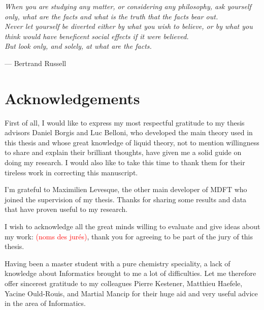 
\begin{flushright}
\textsl{When you are studying any matter, or considering any philosophy,
ask yourself only, what are the facts and what is the truth that the
facts bear out.}\\
\textsl{ Never let yourself be diverted either by what you wish to
believe, or by what you think would have beneficent social effects
if it were believed.}\\
\textsl{ But look only, and solely, at what are the facts.}
\par\end{flushright}

\begin{flushright}
--- Bertrand Russell 
\par\end{flushright}

\bigskip{}


\begingroup
\let\clearpage\relax
\let\cleardoublepage\relax 


\chapter*{Acknowledgements}

First of all, I would like to express my most respectful gratitude
to my thesis advisors Daniel Borgis and Luc Belloni, who developed
the main theory used in this thesis and whose great knowledge of liquid
theory, not to mention willingness to share and explain their brilliant
thoughts, have given me a solid guide on doing my research. I would
also like to take this time to thank them for their tireless work
in correcting this manuscript.

I'm grateful to Maximilien Levesque, the other main developer of MDFT
who joined the supervision of my thesis. Thanks for sharing some results
and data that have proven useful to my research.

I wish to acknowledge all the great minds willing to evaluate and
give ideas about my work: \textcolor{red}{(noms des jurés)}, thank
you for agreeing to be part of the jury of this thesis.

Having been a master student with a pure chemistry speciality, a lack
of knowledge about Informatics brought to me a lot of difficulties.
Let me therefore offer sincerest gratitude to my colleagues Pierre
Kestener, Matthieu Haefele, Yacine Ould-Rouis, and Martial Mancip
for their huge aid and very useful advice in the area of Informatics.

